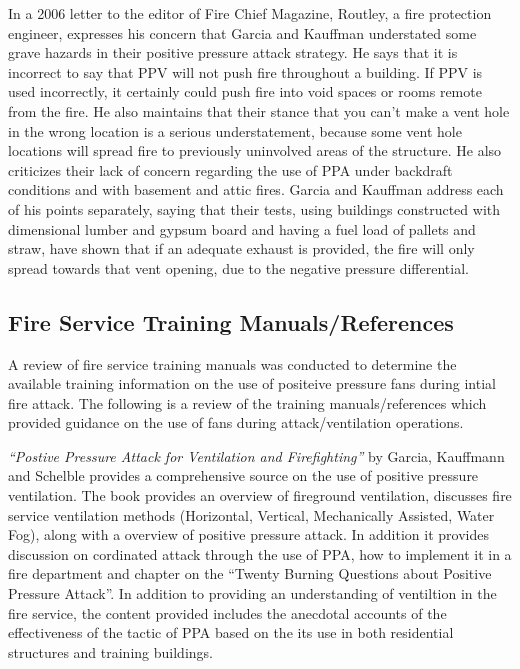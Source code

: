 \documentclass{article}
\begin{document}
In a 2006 letter to the editor of Fire Chief Magazine, Routley, a fire protection engineer, expresses his concern that Garcia and Kauffman understated some grave hazards in their positive pressure attack strategy. He says that it is incorrect to say that PPV will not push fire throughout a building. If PPV is used incorrectly, it certainly could push fire into void spaces or rooms remote from the fire. He also maintains that their stance that you can’t make a vent hole in the wrong location is a serious understatement, because some vent hole locations will spread fire to previously uninvolved areas of the structure. He also criticizes their lack of concern regarding the use of PPA under backdraft conditions and with basement and attic fires. Garcia and Kauffman address each of his points separately, saying that their tests, using buildings constructed with dimensional lumber and gypsum board and having a fuel load of pallets and straw, have shown that if an adequate exhaust is provided, the fire will only spread towards that vent opening, due to the negative pressure differential. \cite{PositiveOversight}

\subsection{Fire Service Training Manuals/References}
A review of fire service training manuals was conducted to determine the available training information on the use of positeive pressure fans during intial fire attack. The following is a review of the training manuals/references which provided guidance on the use of fans during attack/ventilation operations. 

\textit{``Postive Pressure Attack for Ventilation and Firefighting''} by Garcia, Kauffmann and Schelble provides a comprehensive source on the use of positive pressure ventilation. The book provides an overview of fireground ventilation, discusses fire service ventilation methods (Horizontal, Vertical, Mechanically Assisted, Water Fog), along with a overview of positive pressure attack. In addition it provides discussion on cordinated attack through the use of PPA, how to implement it in a fire department and chapter on the ``Twenty Burning Questions about Positive Pressure Attack''. In addition to providing an understanding of ventiltion in the fire service, the content provided includes the anecdotal accounts of the effectiveness of the tactic of PPA based on the its use in both residential structures and training buildings. \cite{PPA_Garcia}
\end{document}
